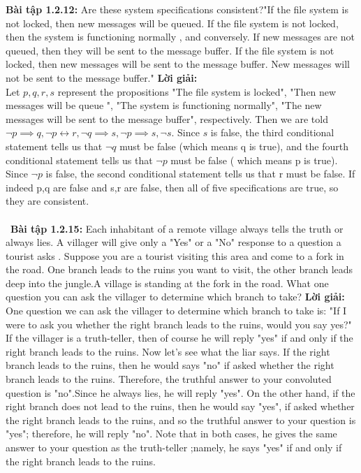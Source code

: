 \documentclass[a4paper]{article}
\begin{document}
\textbf{Bài tập 1.2.12:} Are these system specifications consistent?"If the file system is not locked, then new messages will be queued. If the file system is not locked, then the system is functioning normally , and conversely. If new messages are not queued, then they will be sent to the message buffer. If the file system is not locked, then new messages will be sent to the message buffer. New messages will not be sent to the message buffer."
\textbf{Lời giải: } \\Let $p,q,r,s$ represent the propositions "The file system is locked", "Then new messages will be queue ", "The system is functioning normally", "The new messages will be sent to the message buffer", respectively. Then we are told $\lnot p \implies q, \lnot p \leftrightarrow r, \lnot q \implies s, \lnot p \implies s, \lnot s$. Since $s$ is false, the third conditional statement tells us that $\lnot q$ must be false (which means q is true), and the fourth conditional statement tells us that $\lnot p$ must be false ( which means p is true). Since $\lnot p$  is false, the second conditional statement tells us that r must be false. If indeed p,q are false and s,r are false, then all of five specifications are true, so they are consistent.
 \\\ \\\
\textbf{Bài tập 1.2.15:} Each inhabitant of a remote village always tells the truth or always lies. A villager will give only a "Yes" or a "No" response  to a question a tourist asks . Suppose you are a tourist visiting this area and come to a fork in the road. One branch  leads to the ruins you want to visit, the other branch leads deep into the jungle.A village is standing at the fork in the road. What one question  you can ask the villager to determine which branch to take?
\textbf{Lời giải: } \\One question we can ask the villager to determine which branch to take is: "If I were to ask you whether the right branch leads to the ruins, would you say yes?" If the villager is a truth-teller, then of course he will reply "yes" if and only if the right branch leads to the ruins. Now let's see what the liar says. If the right branch leads to the ruins, then he would says "no" if asked whether the right branch leads to the ruins. Therefore, the truthful answer to your convoluted question is "no".Since he always lies, he will reply "yes". On the other hand, if the right branch does not lead to the ruins, then he would say "yes", if asked whether the right branch leads to the ruins, and so the truthful answer to your question is "yes"; therefore, he will reply "no". Note that in both cases, he gives the same answer to your question as the truth-teller ;namely, he says "yes" if and only if the right branch leads to the ruins. 
\end{document}

